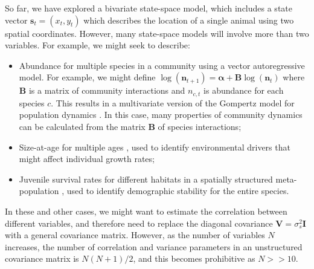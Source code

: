 So far, we have explored a bivariate state-space model, which includes a state vector \( \mathbf{s}_t = (x_t,y_t) \) which describes the location of a single animal using two spatial coordinates.  However, many state-space models will involve more than two variables.  For example, we might seek to describe:
\begin{itemize}
    \item Abundance for multiple species in a community using a vector autoregressive model.  For example, we might define \( \log( \mathbf{n}_{t+1}) = \mathbf{\alpha + B} \log(\mathbf{n}_{t})\) where \(\mathbf{B}\) is a matrix of community interactions and \(n_{c,t}\) is abundance for each species \(c\).  This results in a multivariate version of the Gompertz model for population dynamics \cite{ives_estimating_2003,thorson_estimating_2017}.  In this case, many properties of community dynamics can be calculated from the matrix \(\mathbf{B}\) of species interactions; 

    \item Size-at-age for multiple ages \cite{stawitz_state-space_2015}, used to identify environmental drivers that might affect individual growth rates;

    \item Juvenile survival rates for different habitats in a spatially structured meta-population \cite{minto_productivity_2014}, used to identify demographic stability for the entire species.
\end{itemize}  
In these and other cases, we might want to estimate the correlation between different variables, and therefore need to replace the diagonal covariance \( \mathbf{V} = \sigma_s^2 \mathbf{I} \) with a general covariance matrix.  However, as the number of variables \(N\) increases, the number of correlation and variance parameters in an unstructured covariance matrix is \(N(N+1)/2\), and this becomes prohibitive as \( N>>10 \).  

